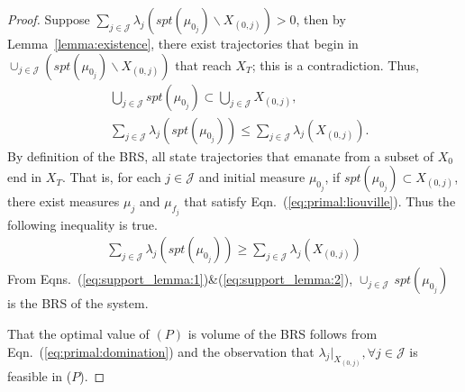   \begin{proof}
  Suppose $\sum_{j\in \mathcal J}\lambda_j(spt(\mu_{0_j})\backslash X_{(0,j)})>0$, then by Lemma~\ref{lemma:existence}, there exist trajectories that begin in $\cup_{j\in \mathcal J}(spt(\mu_{0_j})\backslash X_{(0,j)})$ that reach $X_T$; this is a contradiction. Thus,
  \begin{align}
  &\bigcup_{j\in \mathcal J} spt(\mu_{0_j})\subset \bigcup_{j\in \mathcal J} X_{(0,j)},\\
  &\sum_{j\in \mathcal J}\lambda_j(spt(\mu_{0_j}))\le\sum_{j\in \mathcal J}\lambda_j( X_{(0,j)}).
  \label{eq:support_lemma:1}
  \end{align}
    By definition of the BRS, all state trajectories that emanate from a subset of $X_0$ end in $X_T$. That is, for each $j\in \mathcal J$ and initial measure $\mu_{0_j}$, if $spt(\mu_{0_j})\subset X_{(0,j)}$, there exist measures $\mu_{j}$ and $\mu_{f_j}$ that satisfy Eqn.~(\ref{eq:primal:liouville}). Thus the following inequality is true.
    \begin{align}
    \sum_{j\in \mathcal J}\lambda_j(spt(\mu_{0_j}))\ge \sum_{j\in \mathcal J}\lambda_j(X_{(0,j)})
      \label{eq:support_lemma:2}
    \end{align}
   From Eqns.~(\ref{eq:support_lemma:1})\&(\ref{eq:support_lemma:2}), $\cup_{j\in \mathcal J}\,spt(\mu_{0_j})$ is the BRS of the system.
    \par
    That the optimal value of $(P)$ is volume of the BRS follows from Eqn.~(\ref{eq:primal:domination}) and the observation that \mbox{$\lambda_{j}|_{X_{(0,j)}},\forall j\in \mathcal J$} is feasible in ($P$).
  \end{proof}


